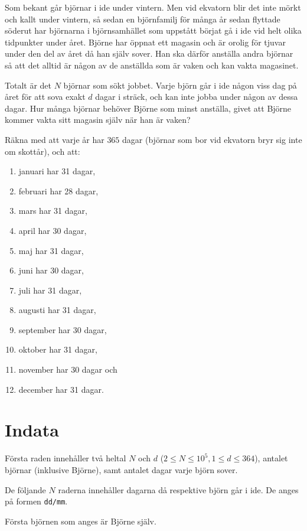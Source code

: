 Som bekant går björnar i ide under vintern. Men vid ekvatorn blir det inte mörkt och kallt under vintern,
så sedan en björnfamilj för många år sedan flyttade söderut har björnarna i björnsamhället som uppstått
börjat gå i ide vid helt olika tidpunkter under året.
Björne har öppnat ett magasin och är orolig för tjuvar under den del av året då han själv sover.
Han ska därför anställa andra björnar så att det alltid är någon av de anställda som är vaken och kan vakta magasinet.

Totalt är det $N$ björnar som sökt jobbet.
Varje björn går i ide någon viss dag på året för att sova exakt $d$ dagar i sträck, och kan inte jobba under någon av dessa dagar.
Hur många björnar behöver Björne som minst anställa, givet att Björne kommer vakta sitt magasin själv när han är vaken?

Räkna med att varje år har $365$ dagar (björnar som bor vid ekvatorn bryr sig inte om skottår), och att:
\begin{enumerate}
  \item januari har 31 dagar, 
  \item februari har 28 dagar, 
  \item mars har 31 dagar, 
  \item april har 30 dagar, 
  \item maj har 31 dagar,  
  \item juni har 30 dagar, 
  \item juli har 31 dagar, 
  \item augusti har 31 dagar, 
  \item september har 30 dagar, 
  \item oktober har 31 dagar, 
  \item november har 30 dagar och 
  \item december har 31 dagar.
\end{enumerate}

\section*{Indata}
Första raden innehåller två heltal $N$ och $d$ ($2 \leq N \leq 10^5, 1 \leq d \leq 364$), antalet björnar (inklusive Björne),
samt antalet dagar varje björn sover.

De följande $N$ raderna innehåller dagarna då respektive björn går i ide. De anges på formen \texttt{dd/mm}.

Första björnen som anges är Björne själv.

